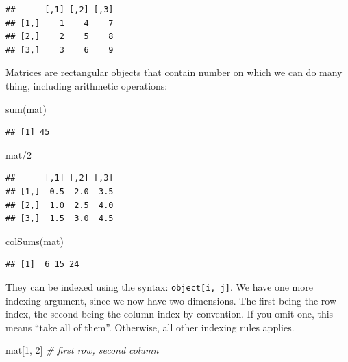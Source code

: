 \documentclass[
]{book}
\newenvironment{Shaded}{\begin{snugshade}}{\end{snugshade}}
\newcommand{\CommentTok}[1]{\textcolor[rgb]{0.56,0.35,0.01}{\textit{#1}}}
\newcommand{\DecValTok}[1]{\textcolor[rgb]{0.00,0.00,0.81}{#1}}
\newcommand{\FunctionTok}[1]{\textcolor[rgb]{0.00,0.00,0.00}{#1}}
\newcommand{\NormalTok}[1]{#1}
\newcommand{\SpecialCharTok}[1]{\textcolor[rgb]{0.00,0.00,0.00}{#1}}
\begin{document}
\begin{verbatim}
##      [,1] [,2] [,3]
## [1,]    1    4    7
## [2,]    2    5    8
## [3,]    3    6    9
\end{verbatim}

Matrices are rectangular objects that contain number on which we can do many thing, including arithmetic operations:

\begin{Shaded}
\begin{Highlighting}[]
\FunctionTok{sum}\NormalTok{(mat)}
\end{Highlighting}
\end{Shaded}

\begin{verbatim}
## [1] 45
\end{verbatim}

\begin{Shaded}
\begin{Highlighting}[]
\NormalTok{mat}\SpecialCharTok{/}\DecValTok{2}
\end{Highlighting}
\end{Shaded}

\begin{verbatim}
##      [,1] [,2] [,3]
## [1,]  0.5  2.0  3.5
## [2,]  1.0  2.5  4.0
## [3,]  1.5  3.0  4.5
\end{verbatim}

\begin{Shaded}
\begin{Highlighting}[]
\FunctionTok{colSums}\NormalTok{(mat)}
\end{Highlighting}
\end{Shaded}

\begin{verbatim}
## [1]  6 15 24
\end{verbatim}

They can be indexed using the syntax: \texttt{object{[}i,\ j{]}}. We have one more indexing argument, since we now have two dimensions. The first being the row index, the second being the column index by convention. If you omit one, this means ``take all of them''. Otherwise, all other indexing rules applies.

\begin{Shaded}
\begin{Highlighting}[]
\NormalTok{mat[}\DecValTok{1}\NormalTok{, }\DecValTok{2}\NormalTok{] }\CommentTok{\# first row, second column}
\end{Highlighting}
\end{Shaded}
\end{document}
